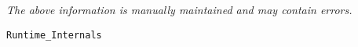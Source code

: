 \label{pkg:runtime\_internals}

{\tiny \it The above information is manually maintained and may contain errors.}
\begin{verbatim}
Runtime_Internals
\end{verbatim}
